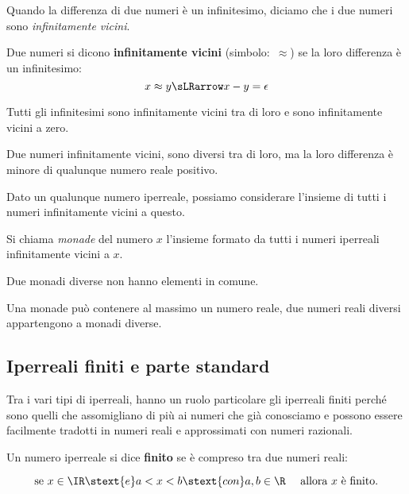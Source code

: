 Quando la differenza di due numeri è un infinitesimo, diciamo 
che i due numeri sono \emph{infinitamente vicini}.

\begin{definizione}    %
Due numeri si dicono \textbf{infinitamente vicini} (simbolo:~\(\approx\)) se 
la loro differenza è un infinitesimo:
\[x \approx y \sLRarrow x - y = \epsilon\]
\end{definizione}

Tutti gli infinitesimi sono infinitamente vicini tra di loro e sono 
infinitamente vicini a zero.

Due numeri infinitamente vicini, sono diversi tra di loro, ma la loro 
differenza è minore di qualunque numero reale positivo.

Dato un qualunque numero iperreale, possiamo considerare l'insieme di tutti 
i numeri infinitamente vicini a questo. 

\begin{definizione}
 Si chiama \emph{monade} del numero \(x\) l'insieme formato da tutti i 
numeri iperreali infinitamente vicini a \(x\).
\end{definizione}

Due monadi diverse non hanno elementi in comune.

Una monade può contenere al massimo un numero reale, due numeri reali 
diversi appartengono a monadi diverse.

\subsection{Iperreali finiti e parte standard}
\label{subsec:insnum_partestandard}

Tra i vari tipi di iperreali, hanno un ruolo particolare gli iperreali 
finiti perché sono quelli che assomigliano di più ai numeri che già 
conosciamo e possono essere facilmente tradotti in numeri reali e 
approssimati con numeri razionali. 

\begin{definizione}
 Un numero iperreale si dice \textbf{finito} se è compreso tra 
due numeri reali:

\[\text{se } x \in \IR \stext{e}  a < x < b \stext{con} 
  a, b \in \R \quad \text{ allora } x \text{ è finito.}\]
\end{definizione}

